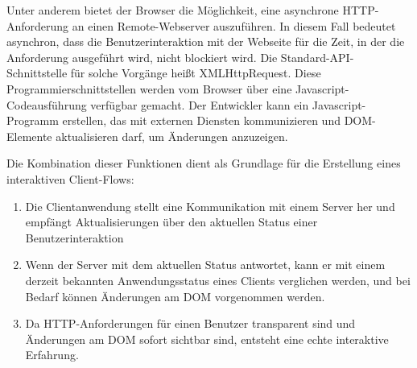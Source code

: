 Unter anderem bietet der Browser die Möglichkeit, eine asynchrone HTTP-Anforderung an einen Remote-Webserver auszuführen. In diesem Fall bedeutet asynchron, dass die Benutzerinteraktion mit der Webseite für die Zeit, in der die Anforderung ausgeführt wird, nicht blockiert wird. Die Standard-API-Schnittstelle für solche Vorgänge heißt XMLHttpRequest. Diese Programmierschnittstellen werden vom Browser über eine Javascript-Codeausführung verfügbar gemacht. Der Entwickler kann ein Javascript-Programm erstellen, das mit externen Diensten kommunizieren und  DOM-Elemente aktualisieren darf, um Änderungen anzuzeigen.

Die Kombination dieser Funktionen dient als Grundlage für die Erstellung eines interaktiven Client-Flows:
\begin{enumerate}
	\item Die Clientanwendung stellt eine Kommunikation mit einem Server her und empfängt Aktualisierungen über den aktuellen Status einer Benutzerinteraktion
	\item Wenn der Server mit dem aktuellen Status antwortet, kann er mit einem derzeit bekannten Anwendungsstatus eines Clients verglichen werden, und bei Bedarf können Änderungen am DOM vorgenommen werden.
	\item Da HTTP-Anforderungen für einen Benutzer transparent sind und Änderungen am DOM sofort sichtbar sind, entsteht eine echte interaktive Erfahrung.
\end{enumerate}

